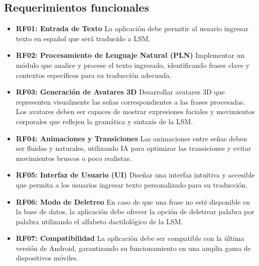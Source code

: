 \subsection{Requerimientos funcionales}
\begin{itemize}
    \item \textbf{RF01: Entrada de Texto}  
    La aplicación debe permitir al usuario ingresar texto en español que será traducido a LSM.
    
    \item \textbf{RF02: Procesamiento de Lenguaje Natural (PLN)}  
    Implementar un módulo que analice y procese el texto ingresado, identificando frases clave y contextos específicos para su traducción adecuada.
    
    \item \textbf{RF03: Generación de Avatares 3D}  
    Desarrollar avatares 3D que representen visualmente las señas correspondientes a las frases procesadas. Los avatares deben ser capaces de mostrar expresiones faciales y movimientos corporales que reflejen la gramática y sintaxis de la LSM.
    
    \item \textbf{RF04: Animaciones y Transiciones}  
    Las animaciones entre señas deben ser fluidas y naturales, utilizando IA para optimizar las transiciones y evitar movimientos bruscos o poco realistas.
    
    \item \textbf{RF05: Interfaz de Usuario (UI)}  
    Diseñar una interfaz intuitiva y accesible que permita a los usuarios ingresar texto personalizado para su traducción.
    
    \item \textbf{RF06: Modo de Deletreo}  
    En caso de que una frase no esté disponible en la base de datos, la aplicación debe ofrecer la opción de deletrear palabra por palabra utilizando el alfabeto dactilológico de la LSM.
    
    \item \textbf{RF07: Compatibilidad}  
    La aplicación debe ser compatible con la última versión de Android, garantizando su funcionamiento en una amplia gama de dispositivos móviles.
\end{itemize}

